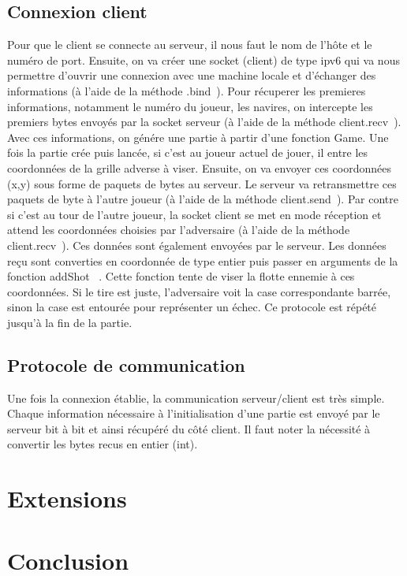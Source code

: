\documentclass{article}
\begin{document}
	\subsection{Connexion client}
	Pour que le client se connecte au serveur, il nous faut le nom de l'h\^ote et le num\'ero de port.
	\newline Ensuite, on va cr\'eer une socket (client) de type ipv6 qui va nous permettre d'ouvrir une connexion avec une machine locale et d'\'echanger des informations (\`a l'aide de la m\'ethode  \guillemotleft .bind\guillemotright\ ).
	\newline Pour r\'ecuperer les premieres informations, notamment le num\'ero du joueur, les navires, on intercepte les premiers bytes envoy\'es par la socket serveur (\`a l'aide de la m\'ethode \guillemotleft client.recv\guillemotright\ ).
	\newline Avec ces informations, on g\'en\'ere une partie \`a partir d'une fonction Game.
	\newline Une fois la partie cr\'ee puis lanc\'ee, si c'est au joueur actuel de jouer, il entre les coordonn\'ees de la grille adverse \`a viser. Ensuite, on va envoyer ces coordonn\'ees (x,y) sous forme de paquets de bytes au serveur. Le serveur va retransmettre ces paquets de byte \`a l'autre joueur (\`a l'aide de la m\'ethode \guillemotleft client.send\guillemotright\ ).
	\newline Par contre si c'est au tour de l'autre joueur, la socket client se met en mode r\'eception et attend les coordonn\'ees choisies par l'adversaire (\`a l'aide de la m\'ethode \guillemotleft client.recv\guillemotright\ ). Ces donn\'ees sont \'egalement envoy\'ees par le serveur. 
	\newline Les donn\'ees re\c cu sont converties en coordonn\'ee de type entier puis passer en arguments de la fonction \guillemotleft addShot \guillemotright\ . Cette fonction tente de viser la flotte ennemie \`a ces coordonn\'ees. Si le tire est juste, l'adversaire voit la case correspondante barr\'ee, sinon la case est entour\'ee pour repr\'esenter un \'echec.    
	\newline Ce protocole est r\'ep\'et\'e jusqu'\`a la fin de la partie.

	\subsection{Protocole de communication}
	Une fois la connexion \'etablie, la communication serveur/client est tr\`es simple.
	Chaque information n\'ecessaire \`a l'initialisation d'une partie est envoy\'e par le serveur bit \`a bit et ainsi r\'ecup\'er\'e du c\^ot\'e client.
	Il faut noter la n\'ecessit\'e \`a convertir les bytes recus en entier (int).

\section{Extensions}

\section{Conclusion}
\end{document}
